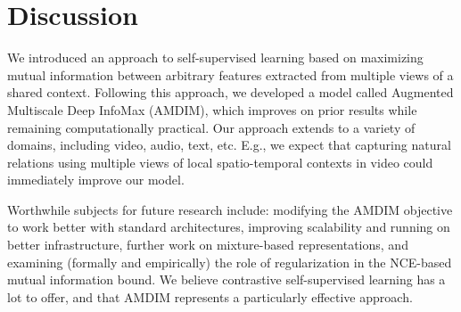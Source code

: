 \documentclass{article}
\begin{document}
%
 
\section{Discussion}
We introduced an approach to self-supervised learning based on maximizing mutual information between arbitrary features extracted from multiple views of a shared context. Following this approach, we developed a model called Augmented Multiscale Deep InfoMax (AMDIM), which improves on prior results while remaining computationally practical. Our approach extends to a variety of domains, including video, audio, text, etc. E.g., we expect that capturing natural relations using multiple views of local spatio-temporal contexts in video could immediately improve our model.

Worthwhile subjects for future research include: modifying the AMDIM objective to work better with standard architectures, improving scalability and running on better infrastructure, further work on mixture-based representations, and examining (formally and empirically) the role of regularization in the NCE-based mutual information bound. We believe contrastive self-supervised learning has a lot to offer, and that AMDIM represents a particularly effective approach. 


\end{document}
